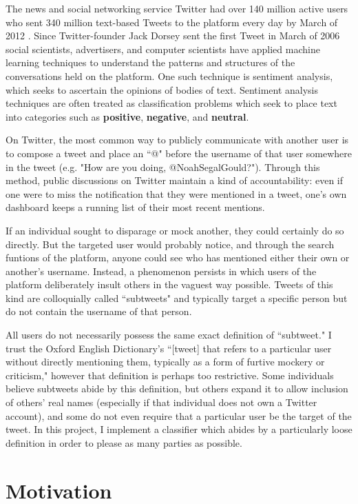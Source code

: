 \documentclass[11pt, twoside, reqno]{book}
\begin{document}
The news and social networking service Twitter had over 140 million active users who sent 340 million text-based Tweets to the platform every day by March of 2012  \cite{twitter_stats}. Since Twitter-founder Jack Dorsey sent the first Tweet in March of 2006  \cite{first_tweet} social scientists, advertisers, and computer scientists have applied machine learning techniques to understand the patterns and structures of the conversations held on the platform. One such technique is sentiment analysis, which seeks to ascertain the opinions of bodies of text. Sentiment analysis techniques are often treated as classification problems which seek to place text into categories such as \textbf{positive}, \textbf{negative}, and \textbf{neutral}.

On Twitter, the most common way to publicly communicate with another user is to compose a tweet and place an ``@" before the username of that user somewhere in the tweet (e.g. "How are you doing, @NoahSegalGould?"). Through this method, public discussions on Twitter maintain a kind of accountability: even if one were to miss the notification that they were mentioned in a tweet, one's own dashboard keeps a running list of their most recent mentions. 

If an individual sought to disparage or mock another, they could certainly do so directly. But the targeted user would probably notice, and through the search funtions of the platform, anyone could see who has mentioned either their own or another's username. Instead, a phenomenon persists in which users of the platform deliberately insult others in the vaguest way possible. Tweets of this kind are colloquially called ``subtweets" and typically target a specific person but do not contain the username of that person.

All users do not necessarily possess the same exact definition of ``subtweet." I trust the Oxford English Dictionary's ``[tweet] that refers to a particular user without directly mentioning them, typically as a form of furtive mockery or criticism," however that definition is perhaps too restrictive. Some individuals believe subtweets abide by this definition, but others expand it to allow inclusion of others' real names (especially if that individual does not own a Twitter account), and some do not even require that a particular user be the target of the tweet. In this project, I implement a classifier which abides by a particularly loose definition in order to please as many parties as possible. 

\section{Motivation}
\label{motivation_and_prior_work}
\end{document}
